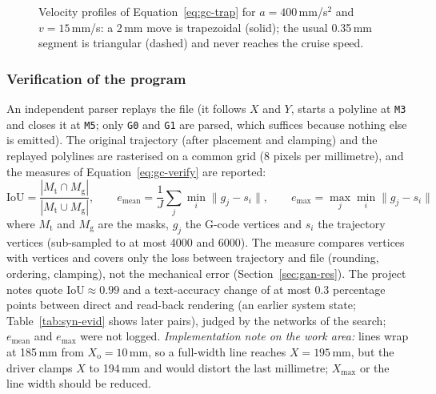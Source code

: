 \begin{figure}[!htbp]
\centering
{}
\caption{Velocity profiles of Equation~\ref{eq:gc-trap} for $a=400$\,mm/s$^2$ and $v=15$\,mm/s: a 2\,mm move is trapezoidal (solid); the usual 0.35\,mm segment is triangular (dashed) and never reaches the cruise speed.}
\label{fig:gc-vel}
\end{figure}

\subsubsection{Verification of the program}
\label{sec:gc-verify}

An independent parser replays the file (it follows $X$ and $Y$, starts a polyline at \texttt{M3} and closes it at \texttt{M5}; only \texttt{G0} and \texttt{G1} are parsed, which suffices because nothing else is emitted).
The original trajectory (after placement and clamping) and the replayed polylines are rasterised on a common grid (8 pixels per millimetre), and the measures of Equation~\ref{eq:gc-verify} are reported:
\begin{equation}
\mathrm{IoU}=\frac{|M_{\mathrm t}\cap M_{\mathrm g}|}{|M_{\mathrm t}\cup M_{\mathrm g}|},\qquad e_{\mathrm{mean}}=\frac{1}{J}\sum_j\min_i\lVert g_j-s_i\rVert,\qquad e_{\max}=\max_j\min_i\lVert g_j-s_i\rVert
\label{eq:gc-verify}
\end{equation}
where $M_{\mathrm t}$ and $M_{\mathrm g}$ are the masks, $g_j$ the G-code vertices and $s_i$ the trajectory vertices (sub-sampled to at most 4000 and 6000).
The measure compares vertices with vertices and covers only the loss between trajectory and file (rounding, ordering, clamping), not the mechanical error (Section~\ref{sec:gan-res}).
The project notes quote $\mathrm{IoU}\approx0.99$ and a text-accuracy change of at most 0.3 percentage points between direct and read-back rendering (an earlier system state; Table~\ref{tab:syn-evid} shows later pairs), judged by the networks of the search; $e_{\mathrm{mean}}$ and $e_{\max}$ were not logged.
\emph{Implementation note on the work area:} lines wrap at 185\,mm from $X_{\mathrm o}=10$\,mm, so a full-width line reaches $X=195$\,mm, but the driver clamps $X$ to 194\,mm and would distort the last millimetre; $X_{\max}$ or the line width should be reduced.
